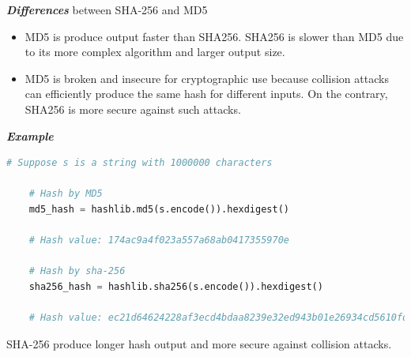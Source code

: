 \documentclass{article}
\begin{document}
\textbf{\textit{Differences}} between SHA-256 and MD5
\begin{itemize}
	\item MD5 is produce output faster than SHA256. SHA256 is slower than MD5 due to its more complex algorithm and larger output size.

	\item MD5 is broken and insecure for cryptographic use because collision attacks can efficiently produce the same hash for different inputs\cite{2-1-1.Hash(1)}. On the contrary, SHA256 is more secure against such attacks.
\end{itemize}

\textbf{\textit{Example}}

	\begin{lstlisting}[language=Python]
	# Suppose s is a string with 1000000 characters
	
	# Hash by MD5
	md5_hash = hashlib.md5(s.encode()).hexdigest()

	# Hash value: 174ac9a4f023a557a68ab0417355970e

	# Hash by sha-256
	sha256_hash = hashlib.sha256(s.encode()).hexdigest()

	# Hash value: ec21d64624228af3ecd4bdaa8239e32ed943b01e26934cd5610fddb361426dc6
	\end{lstlisting}

	SHA-256 produce longer hash output and more secure against collision attacks.



\end{document}
